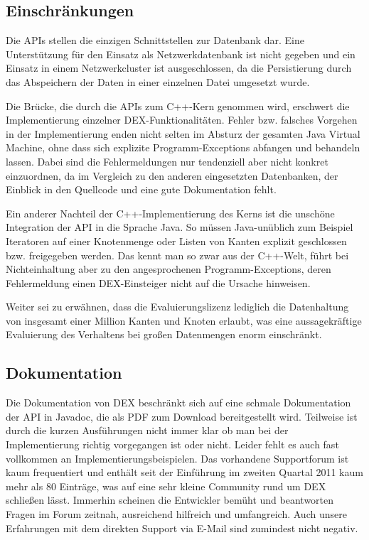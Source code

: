 \documentclass[11pt, a4paper, oneside]{article} %
\begin{document}
\subsection{Einschränkungen}

Die APIs stellen die einzigen Schnittstellen zur Datenbank dar. Eine Unterstützung für den Einsatz als Netzwerkdatenbank ist nicht gegeben und ein Einsatz in einem Netzwerkcluster ist ausgeschlossen, da die Persistierung durch das Abspeichern der Daten in einer einzelnen Datei umgesetzt wurde.

Die Brücke, die durch die APIs zum C++-Kern genommen wird, erschwert die Implementierung einzelner DEX-Funktionalitäten. Fehler bzw. falsches Vorgehen in der Implementierung enden nicht selten im Absturz der gesamten Java Virtual Machine, ohne dass sich explizite Programm-Exceptions abfangen und behandeln lassen. Dabei sind die Fehlermeldungen nur tendenziell aber nicht konkret einzuordnen, da im Vergleich zu den anderen eingesetzten Datenbanken, der Einblick in den Quellcode und eine gute Dokumentation fehlt. 

Ein anderer Nachteil der C++-Implementierung des Kerns ist die unschöne Integration der API in die Sprache Java. So müssen Java-unüblich zum Beispiel Iteratoren auf einer Knotenmenge oder Listen von Kanten explizit geschlossen bzw. freigegeben werden. Das kennt man so zwar aus der C++-Welt, führt bei Nichteinhaltung aber zu den angesprochenen Programm-Exceptions, deren Fehlermeldung einen DEX-Einsteiger nicht auf die Ursache hinweisen.

Weiter sei zu erwähnen, dass die Evaluierungslizenz lediglich die Datenhaltung von insgesamt einer Million Kanten und Knoten erlaubt, was eine aussagekräftige Evaluierung des Verhaltens bei großen Datenmengen enorm einschränkt.

\subsection{Dokumentation}

Die Dokumentation von DEX beschränkt sich auf eine schmale Dokumentation der API in Javadoc, die als PDF zum Download bereitgestellt wird. Teilweise ist durch die kurzen Ausführungen nicht immer klar ob man bei der Implementierung richtig vorgegangen ist oder nicht. Leider fehlt es auch fast vollkommen an Implementierungsbeispielen. Das vorhandene Supportforum ist kaum frequentiert und enthält seit der Einführung im zweiten Quartal 2011 kaum mehr als 80 Einträge, was auf eine sehr kleine Community rund um DEX schließen lässt. Immerhin scheinen die Entwickler bemüht und beantworten Fragen im Forum zeitnah, ausreichend hilfreich und umfangreich. Auch unsere Erfahrungen mit dem direkten Support via E-Mail sind zumindest nicht negativ.
\end{document}
